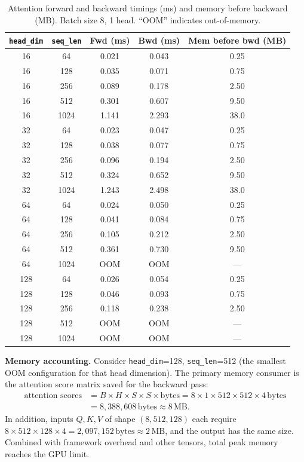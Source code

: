 \documentclass[11pt]{article}
\begin{document}
\begin{table}[H]
\centering
\caption{Attention forward and backward timings (ms) and memory before backward (MB).
Batch size 8, 1 head. ``OOM'' indicates out-of-memory.}
\small
\begin{tabular}{cc|ccc}
\toprule
\texttt{head\_dim} & \texttt{seq\_len} & Fwd (ms) & Bwd (ms) & Mem before bwd (MB) \\
\midrule
16  & 64   & 0.021 & 0.043 & 0.25 \\
16  & 128  & 0.035 & 0.071 & 0.75 \\
16  & 256  & 0.089 & 0.178 & 2.50 \\
16  & 512  & 0.301 & 0.607 & 9.50 \\
16  & 1024 & 1.141 & 2.293 & 38.0 \\
32  & 64   & 0.023 & 0.047 & 0.25 \\
32  & 128  & 0.038 & 0.077 & 0.75 \\
32  & 256  & 0.096 & 0.194 & 2.50 \\
32  & 512  & 0.324 & 0.652 & 9.50 \\
32  & 1024 & 1.243 & 2.498 & 38.0 \\
64  & 64   & 0.024 & 0.050 & 0.25 \\
64  & 128  & 0.041 & 0.084 & 0.75 \\
64  & 256  & 0.105 & 0.212 & 2.50 \\
64  & 512  & 0.361 & 0.730 & 9.50 \\
64  & 1024 & OOM   & OOM   & ---  \\
128 & 64   & 0.026 & 0.054 & 0.25 \\
128 & 128  & 0.046 & 0.093 & 0.75 \\
128 & 256  & 0.118 & 0.238 & 2.50 \\
128 & 512  & OOM   & OOM   & ---  \\
128 & 1024 & OOM   & OOM   & ---  \\
\bottomrule
\end{tabular}
\end{table}

\textbf{Memory accounting.} Consider \texttt{head\_dim}=128, \texttt{seq\_len}=512
(the smallest OOM configuration for that head dimension). The primary memory consumer
is the attention score matrix saved for the backward pass:
\begin{align*}
  \text{attention scores} &= B \times H \times S \times S \times \text{bytes}
  = 8 \times 1 \times 512 \times 512 \times 4\,\text{bytes}\\
  &= 8{,}388{,}608\,\text{bytes} \approx 8\,\text{MB}.
\end{align*}
In addition, inputs $Q,K,V$ of shape $(8, 512, 128)$ each require
$8 \times 512 \times 128 \times 4 = 2{,}097{,}152\,\text{bytes} \approx 2\,\text{MB}$,
and the output has the same size. Combined with framework overhead and other tensors,
total peak memory reaches the GPU limit.
\end{document}
